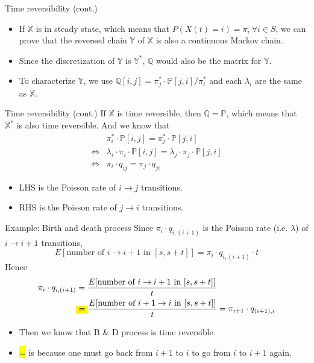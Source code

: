 \documentclass[mathserif]{beamer}
\begin{document}
\begin{frame}{Time reversibility (cont.)}
\begin{itemize}
\item If $\mathbb{X}$ is in steady state, which means that $P(X(t) = i) = \pi_i ~\forall i\in S$, we can prove that the reversed chain $\mathbb{Y}$ of $\mathbb{X}$ is also a continuous Markov chain.
\item Since the discretization of $\mathbb{Y}$ is $\mathbb{Y}^*$, $\mathbb{Q}$ would also be the matrix for $\mathbb{Y}$.
\item To characterize $\mathbb{Y}$, we use $\mathbb{Q}[i,j] = \pi_j^*\cdot \mathbb{P}[j,i] / \pi_i^*$ and each $\lambda_i$ are the same as $\mathbb{X}$.
\end{itemize}
\end{frame}

\begin{frame}{Time reversibility (cont.)}
If $\mathbb{X}$ is time reversible, then $\mathbb{Q} = \mathbb{P}$, which means that $\mathbb{X}^*$ is also time reversible.
And we know that
\begin{align*}
& \pi_i^*\cdot \mathbb{P}[i,j] = \pi_j^*\cdot \mathbb{P}[j,i] \\
\iff & \lambda_i\cdot \pi_i\cdot \mathbb{P}[i,j] = \lambda_j\cdot \pi_j\cdot \mathbb{P}[j,i] \\
\iff & \pi_i\cdot q_{ij} = \pi_j\cdot q_{ji}
\end{align*}
\begin{itemize}
\item LHS is the Poisson rate of $i\to j$ transitions.
\item RHS is the Poisson rate of $j\to i$ transitions.
\end{itemize}
\end{frame}

\begin{frame}{Example: Birth and death process}
Since $\pi_i\cdot q_{i,(i+1)}$ is the Poisson rate (i.e. $\lambda$) of $i\to i+1$ transitions,
\[
E[\text{number of $i\to i+1$ in $[s,s+t]$}] = \pi_i\cdot q_{i,(i+1)}\cdot t
\]
Hence
\begin{align*}
\pi_i\cdot q_{i,(i+1)} & = \frac{E[\text{number of $i\to i+1$ in $[s,s+t]$}]}{t} \\
& \colorbox{yellow}{=} \frac{E[\text{number of $i + 1\to i$ in $[s,s+t]$}]}{t} = \pi_{i+1}\cdot q_{(i+1),i}
\end{align*}
\begin{itemize}
\item Then we know that B \& D process is time reversible.
\item \colorbox{yellow}{=} is because one must go back from $i+1$ to $i$ to go from $i$ to $i+1$ again.
\end{itemize}
\end{frame}
\end{document}
